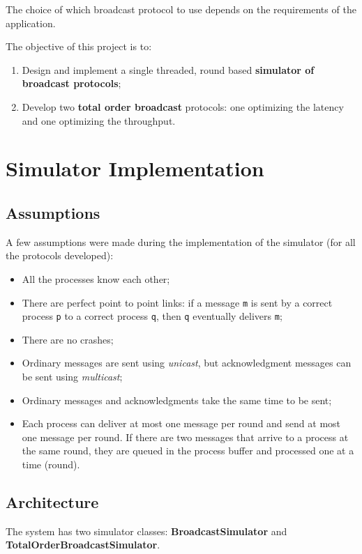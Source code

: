 \documentclass[a4paper, 11pt]{article}
\begin{document}
	The choice of which broadcast protocol to use depends on the requirements of the application.

	The objective of this project is to:

\begin{enumerate}	
	\item Design and implement a single threaded, round based \textbf{simulator of broadcast protocols};
	\item Develop two \textbf{total order broadcast} protocols: one optimizing the latency and one optimizing the throughput.
\end{enumerate}
	
\newpage
\section{Simulator Implementation}
\subsection{Assumptions}
	A few assumptions were made during the implementation of the simulator (for all the protocols developed):

\begin{itemize}
	\item All the processes know each other;
	\item There are perfect point to point links: if a message \texttt{m} is sent by a correct process \texttt{p} to a correct process \texttt{q}, then \texttt{q} eventually delivers \texttt{m};
	\item There are no crashes;
	\item Ordinary messages are sent using \textit{unicast}, but acknowledgment messages can be sent using \textit{multicast};
	\item Ordinary messages and acknowledgments take the same time to be sent;
	\item Each process can deliver at most one message per round and send at most one message per round. If there are two messages that arrive to a process at the same round, they are queued in the process buffer and processed one at a time (round).
\end{itemize}

\subsection{Architecture}
	The system has two simulator classes: \textbf{BroadcastSimulator} and \textbf{TotalOrderBroadcastSimulator}. 
	
\end{document}
